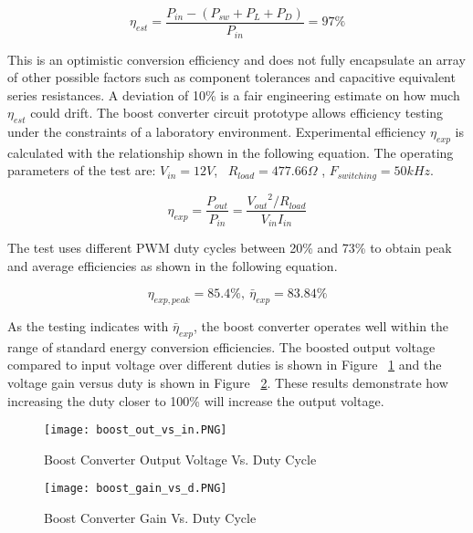 \begin{equation}
\eta_{est} = \frac{P_{in} - {(P_{sw}+P_L+P_D)}}{P_{in}} = 97\%
\end{equation}


This is an optimistic conversion efficiency and does not fully encapsulate an array of other possible factors such as component tolerances and capacitive equivalent series resistances. A deviation of 10\% is a fair engineering estimate on how much $\eta_{est}$ could drift. The boost converter circuit prototype allows efficiency testing under the constraints of a laboratory environment. Experimental efficiency $\eta_{exp}$ is calculated with the relationship shown in the following equation. The operating parameters of the test are: $V_{in} = 12V$,~ $R_{load} = 477.66\Omega$ , $F_{switching} = 50 kHz$. 

\begin{equation}
\eta_{exp} = \frac{P_{out}}{P_{in}} = \frac{{V_{out}}^2/{R_{load}}}{{V_{in}}{I_{in}}}
\end{equation}

The test uses different PWM duty cycles between 20\% and 73\% to obtain peak and average efficiencies as shown in the following equation.

\begin{equation}
\eta_{exp,peak} = 85.4\%, ~ \bar{\eta}_{exp} = 83.84\% 
\end{equation}


As the testing indicates with $\bar{\eta}_{exp}$, the boost converter operates well within the range of standard energy conversion efficiencies. The boosted output voltage compared to input voltage over different duties is shown in Figure ~\ref{Boost Converter Output Voltage Vs. Duty Cycle} and the voltage gain versus duty is shown in Figure ~\ref{Boost Converter Gain Vs. Duty Cycle}. These results demonstrate how increasing the duty closer to 100\% will increase the output voltage.

\begin{figure}
\centering
\texttt{[image: boost\_out\_vs\_in.PNG]}
\caption{Boost Converter Output Voltage Vs. Duty Cycle}
\label{Boost Converter Output Voltage Vs. Duty Cycle}
\end{figure}

\begin{figure}
\centering
\texttt{[image: boost\_gain\_vs\_d.PNG]}
\caption{Boost Converter Gain Vs. Duty Cycle}
\label{Boost Converter Gain Vs. Duty Cycle}
\end{figure}



